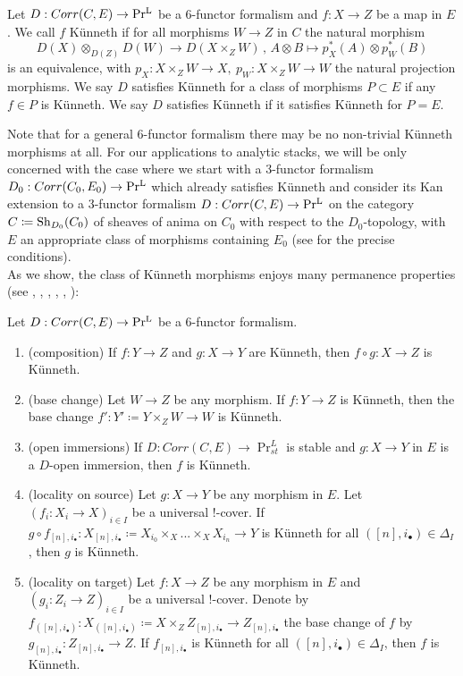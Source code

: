\begin{definition}
Let $D: Corr(C,E) \to \operatorname{Pr^{L}}$ be a $6$-functor formalism and $f: X\to Z$ be a map in $E$. We call $f$ Künneth if for all morphisms $W\to Z$ in $C$ the natural morphism 
\[D(X)\otimes_{D(Z)} D(W) \rightarrow D(X\times_Z W) \,, \, A\otimes B \mapsto p_X^*(A)\otimes p_W^*(B)
\]
is an equivalence, with $p_X : X \times_Z W \to X,\  p_W: X \times_Z W \to W$ the natural projection morphisms. We say $D$ satisfies Künneth for a class of morphisms $P\subset E$ if any  $f\in P$ is Künneth. We say $D$ satisfies Künneth if it satisfies Künneth for $P=E$.
\end{definition}
Note that for a general $6$-functor formalism there may be no non-trivial Künneth morphisms at all. For our applications to analytic stacks, we will be only concerned with the case where we start with a $3$-functor formalism $D_0: Corr(C_0,E_0) \to \operatorname{Pr^{L}}$ which already satisfies Künneth and consider its Kan extension to a $3$-functor formalism $D: Corr(C,E) \to \operatorname{Pr^{L}}$ on the category $C\coloneqq \operatorname{Sh}_{D_0}(C_0)$ of sheaves of anima on $C_0$ with respect to the $D_0$-topology, with $E$ an appropriate class of morphisms containing $E_0$ (see \Cite[Theorem 3.4.11]{heyer20246} for the precise conditions). \\
As we show, the class of Künneth morphisms enjoys many permanence properties (see , , , , , ):

\begin{proposition}\label{THM A}
Let $D: Corr(C,E) \to \operatorname{Pr^{L}}$ be a $6$-functor formalism.
\begin{enumerate}
\item (composition) If $f: Y \to Z$ and $g: X \to Y$ are Künneth, then $f\circ g: X \to Z$ is Künneth.
    \item (base change)  Let  $W \to Z$ be any morphism. If $f: Y \to Z$ is Künneth, then the base change $f': Y'\coloneqq Y\times_Z W \to W$ is Künneth.
   \item (open immersions) If $D: Corr(C,E) \to \Pr_{st}^L$ is stable and  $g: X \to Y$ in $E$ is a $D$-open immersion, then $f$ is Künneth.
    \item (locality on source) Let $g: X \to Y$ be any morphism in $E$. Let $(f_i: {X}_i\to X)_{i\in I}$ be a universal $!$-cover. If $g\circ f_{[n],i_\bullet} : X_{[n],i_\bullet}\coloneqq X_{i_0}\times_X ... \times_X X_{i_n} \to Y$ is Künneth for all $([n],i_\bullet)\in \Delta_I$, then $g$ is Künneth.
    \item  (locality on target) Let $f: X \to Z$ be any morphism in $E$ and $(g_i: Z_i\to Z)_{i\in I}$ be a universal $!$-cover. Denote by  $f_{([n],i_\bullet)}: X_{([n],i_\bullet)}\coloneqq X \times_Z Z_{[n],i_\bullet} \to Z_{[n],i_\bullet}$ the base change of $f$ by $g_{[n],i_\bullet}: Z_{[n],i_\bullet} \to Z$. If $f_{[n],i_\bullet}$ is Künneth for all $([n],i_\bullet)\in \Delta_I$, then $f$ is Künneth.
\end{enumerate}
\end{proposition}

